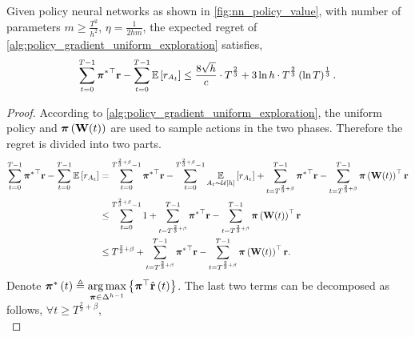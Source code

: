 \begin{thm}
\label{thm:policy_gradient_main_result}
    Given policy neural networks as shown in \cref{fig:nn_policy_value}, with number of parameters $m \ge \frac{T^2}{h^2}$, $\eta = \frac{1}{2 h m}$, the expected regret of \cref{alg:policy_gradient_uniform_exploration} satisfies,
\begin{equation*}
\small
\begin{split}
    \sum\limits_{t=0}^{T-1}{ {\rvpi^*}^\top \rvr } - \sum\limits_{t=0}^{T-1}{ \sE \left[ r_{A_t} \right] } \le \frac{8 \sqrt{h}}{c} \cdot T^{\frac{2}{3}} + 3 \ln{h} \cdot T^{\frac{2}{3}} \left(\ln{T}\right)^{\frac{1}{3}}.
\end{split}
\end{equation*}
\end{thm}
\begin{proof}
According to \cref{alg:policy_gradient_uniform_exploration}, the uniform policy and ${\boldsymbol{\pi}}\left( {\mathbf{W}}(t) \right)$ are used to sample actions in the two phases. Therefore the regret is divided into two parts.
\begin{equation}
\label{eq:total_regret_decomposition}
\begin{split}
    \sum\limits_{t=0}^{T-1}{ {{\boldsymbol{\pi}}^*}^\top {\mathbf{r}} } - \sum\limits_{t=0}^{T-1}{ {\mathbb{E}} \left[ r_{ A_t} \right] } &= \sum\limits_{t=0}^{T^{\frac{2}{3} + \beta} - 1}{ {{\boldsymbol{\pi}}^*}^\top {\mathbf{r}}} - \sum\limits_{t=0}^{T^{\frac{2}{3} + \beta} - 1}{ \operatorname*{{\mathbb{E}}}\limits_{A_t \sim {\mathcal{U}}\left[h\right]}{ \left[ r_{A_t} \right] }} + \sum\limits_{t=T^{\frac{2}{3} + \beta}}^{T-1}{ {{\boldsymbol{\pi}}^*}^\top {\mathbf{r}} }  - \sum\limits_{t=T^{\frac{2}{3} + \beta}}^{T-1}{ {\boldsymbol{\pi}}\left( {\mathbf{W}}(t) \right)^\top {\mathbf{r}} } \\
    &\le \sum\limits_{t=0}^{T^{\frac{2}{3} + \beta} - 1}{1} + \sum\limits_{t=T^{\frac{2}{3} + \beta}}^{T-1}{ {{\boldsymbol{\pi}}^*}^\top {\mathbf{r}} } - \sum\limits_{t=T^{\frac{2}{3} + \beta}}^{T-1}{ {\boldsymbol{\pi}}\left( {\mathbf{W}}(t) \right)^\top {\mathbf{r}} } \\
    &\le T^{\frac{2}{3} + \beta} + \sum\limits_{t=T^{\frac{2}{3} + \beta}}^{T-1}{ {{\boldsymbol{\pi}}^*}^\top {\mathbf{r}} } - \sum\limits_{t=T^{\frac{2}{3} + \beta}}^{T-1}{ {\boldsymbol{\pi}}\left( {\mathbf{W}}(t) \right)^\top {\mathbf{r}} }.
\end{split}
\end{equation}
Denote ${\boldsymbol{\pi}}^*\left(t\right) \triangleq \operatorname*{arg\,max}\limits_{{\boldsymbol{\pi}} \in \Delta^{h-1}}{\left\{ {\boldsymbol{\pi}}^\top \hat{{\mathbf{r}}}\left(t\right)\right\}}$. The last two terms can be decomposed as follows, $\forall t \ge T^{\frac{2}{3} + \beta}$,
\begin{equation}
\label{eq:playing_learning_phase_regret_decomposition}

\end{equation}
\end{proof}
